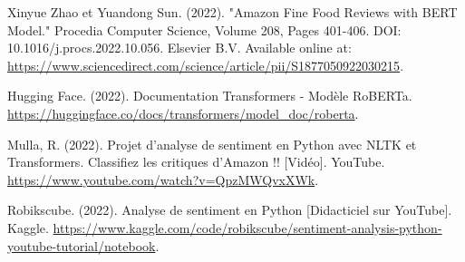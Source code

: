\documentclass{rapportCS}
\begin{document}

\tabledematieres %







\newpage









\begin{thebibliography}{15}

Xinyue Zhao et Yuandong Sun. (2022). "Amazon Fine Food Reviews with BERT Model." Procedia Computer Science, Volume 208, Pages 401-406. DOI: 10.1016/j.procs.2022.10.056. Elsevier B.V. Available online at: \url{https://www.sciencedirect.com/science/article/pii/S1877050922030215}.

Hugging Face. (2022). Documentation Transformers - Modèle RoBERTa. \url{https://huggingface.co/docs/transformers/model_doc/roberta}.

Mulla, R. (2022). Projet d'analyse de sentiment en Python avec NLTK et  Transformers. Classifiez les critiques d'Amazon !! [Vidéo]. YouTube. \url{https://www.youtube.com/watch?v=QpzMWQvxXWk}.

Robikscube. (2022). Analyse de sentiment en Python  [Didacticiel sur YouTube]. Kaggle. \url{https://www.kaggle.com/code/robikscube/sentiment-analysis-python-youtube-tutorial/notebook}.


\end{thebibliography}




\newpage
\listoffigures
\end{document}
